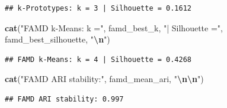 \documentclass[
]{article}
\newenvironment{Shaded}{\begin{snugshade}}{\end{snugshade}}
\newcommand{\FunctionTok}[1]{\textcolor[rgb]{0.13,0.29,0.53}{\textbf{#1}}}
\newcommand{\NormalTok}[1]{#1}
\newcommand{\SpecialCharTok}[1]{\textcolor[rgb]{0.81,0.36,0.00}{\textbf{#1}}}
\newcommand{\StringTok}[1]{\textcolor[rgb]{0.31,0.60,0.02}{#1}}
\begin{document}
\begin{verbatim}
## k-Prototypes: k = 3 | Silhouette = 0.1612
\end{verbatim}

\begin{Shaded}
\begin{Highlighting}[]
\FunctionTok{cat}\NormalTok{(}\StringTok{"FAMD k{-}Means: k ="}\NormalTok{, famd\_best\_k,}
    \StringTok{"| Silhouette ="}\NormalTok{, famd\_best\_silhouette, }\StringTok{"}\SpecialCharTok{\textbackslash{}n}\StringTok{"}\NormalTok{)}
\end{Highlighting}
\end{Shaded}

\begin{verbatim}
## FAMD k-Means: k = 4 | Silhouette = 0.4268
\end{verbatim}

\begin{Shaded}
\begin{Highlighting}[]
\FunctionTok{cat}\NormalTok{(}\StringTok{"FAMD ARI stability:"}\NormalTok{, famd\_mean\_ari, }\StringTok{"}\SpecialCharTok{\textbackslash{}n\textbackslash{}n}\StringTok{"}\NormalTok{)}
\end{Highlighting}
\end{Shaded}

\begin{verbatim}
## FAMD ARI stability: 0.997
\end{verbatim}
\end{document}
